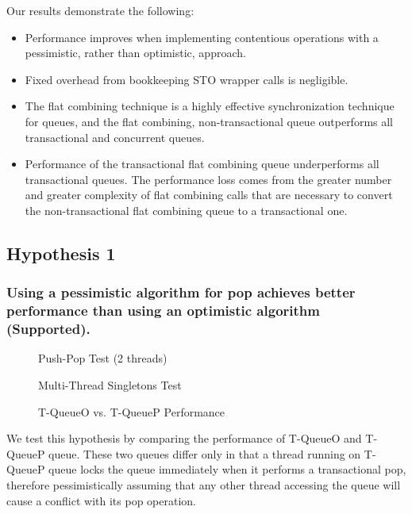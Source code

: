 Our results demonstrate the following:
\begin{itemize}
    \item Performance improves when implementing contentious operations with a pessimistic, rather than optimistic, approach.
    \item Fixed overhead from bookkeeping STO wrapper calls is negligible.
    \item The flat combining technique is a highly effective synchronization technique for queues, and the flat combining, non-transactional queue outperforms all transactional and concurrent queues.
    \item Performance of the transactional flat combining queue underperforms all transactional queues. The performance loss comes from the greater number and greater complexity of flat combining calls that are necessary to convert the non-transactional flat combining queue to a transactional one.
\end{itemize}

\subsection[Hypothesis 1]{Hypothesis 1}
\subsubsection{Using a pessimistic algorithm for pop achieves better performance than using an optimistic algorithm (Supported).}
\begin{figure}[ht!]
    \centering
	\begin{minipage}{0.75\textwidth}
        \caption*{Push-Pop Test (2 threads)}
        \vspace{12pt}
	\end{minipage}
	\begin{minipage}{0.75\textwidth}
        \caption*{Multi-Thread Singletons Test}
	\end{minipage}
    \caption{T-QueueO vs. T-QueueP Performance}
    \label{fig:stoqs}
\end{figure}


We test this hypothesis by comparing the performance of T-QueueO and T-QueueP queue. These two queues differ only in that a thread running on T-QueueP queue locks the queue immediately when it performs a transactional pop, therefore pessimistically assuming that any other thread accessing the queue will cause a conflict with its pop operation.

